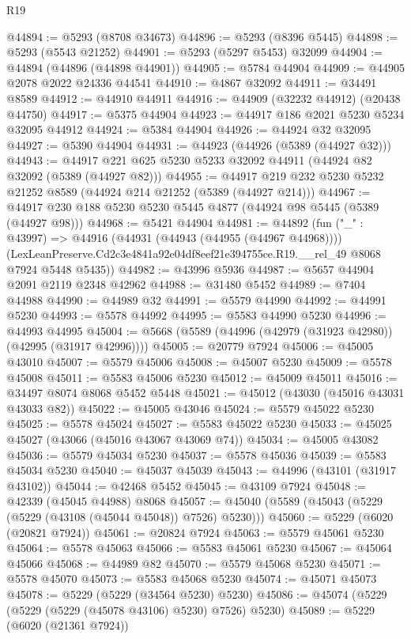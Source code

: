 \begin{lexlean}{R19}
\begin{coremodule}
@44894 := @5293 (@8708 @34673)
@44896 := @5293 (@8396 @5445)
@44898 := @5293 (@5543 @21252)
@44901 := @5293 (@5297 @5453) @32099
@44904 := @44894 (@44896 (@44898 @44901))
@44905 := @5784 @44904
@44909 := @44905 @2078 @2022 @24336 @44541
@44910 := @4867 @32092
@44911 := @34491 @8589
@44912 := @44910 @44911
@44916 := @44909 (@32232 @44912) (@20438 @44750)
@44917 := @5375 @44904
@44923 := @44917 @186 @2021 @5230 @5234 @32095 @44912
@44924 := @5384 @44904
@44926 := @44924 @32 @32095
@44927 := @5390 @44904
@44931 := @44923 (@44926 (@5389 (@44927 @32)))
@44943 := @44917 @221 @625 @5230 @5233 @32092 @44911 (@44924 @82 @32092 (@5389 (@44927 @82)))
@44955 := @44917 @219 @232 @5230 @5232 @21252 @8589 (@44924 @214 @21252 (@5389 (@44927 @214)))
@44967 := @44917 @230 @188 @5230 @5230 @5445 @4877 (@44924 @98 @5445 (@5389 (@44927 @98)))
@44968 := @5421 @44904
@44981 := @44892
    (fun ("_" : @43997) =>
    @44916
      (@44931 (@44943 (@44955 (@44967 @44968))))
      (LexLeanPreserve.Cd2c3e4841a92e04df8eef21e394755ce.R19.__rel_49 @8068 @7924 @5448 @5435))
@44982 := @43996 @5936
@44987 := @5657 @44904 @2091 @2119 @2348 @42962
@44988 := @31480 @5452
@44989 := @7404 @44988
@44990 := @44989 @32
@44991 := @5579 @44990
@44992 := @44991 @5230
@44993 := @5578 @44992
@44995 := @5583 @44990 @5230
@44996 := @44993 @44995
@45004 := @5668 (@5589 (@44996 (@42979 (@31923 @42980)) (@42995 (@31917 @42996))))
@45005 := @20779 @7924
@45006 := @45005 @43010
@45007 := @5579 @45006
@45008 := @45007 @5230
@45009 := @5578 @45008
@45011 := @5583 @45006 @5230
@45012 := @45009 @45011
@45016 := @34497 @8074 @8068 @5452 @5448
@45021 := @45012 (@43030 (@45016 @43031 @43033 @82))
@45022 := @45005 @43046
@45024 := @5579 @45022 @5230
@45025 := @5578 @45024
@45027 := @5583 @45022 @5230
@45033 := @45025 @45027 (@43066 (@45016 @43067 @43069 @74))
@45034 := @45005 @43082
@45036 := @5579 @45034 @5230
@45037 := @5578 @45036
@45039 := @5583 @45034 @5230
@45040 := @45037 @45039
@45043 := @44996 (@43101 (@31917 @43102))
@45044 := @42468 @5452
@45045 := @43109 @7924
@45048 := @42339 (@45045 @44988) @8068
@45057 := @45040 (@5589 (@45043 (@5229 (@5229 (@43108 (@45044 @45048)) @7526) @5230)))
@45060 := @5229 (@6020 (@20821 @7924))
@45061 := @20824 @7924
@45063 := @5579 @45061 @5230
@45064 := @5578 @45063
@45066 := @5583 @45061 @5230
@45067 := @45064 @45066
@45068 := @44989 @82
@45070 := @5579 @45068 @5230
@45071 := @5578 @45070
@45073 := @5583 @45068 @5230
@45074 := @45071 @45073
@45078 := @5229 (@5229 (@34564 @5230) @5230)
@45086 := @45074 (@5229 (@5229 (@5229 (@45078 @43106) @5230) @7526) @5230)
@45089 := @5229 (@6020 (@21361 @7924))

\end{coremodule}
\end{lexlean}

